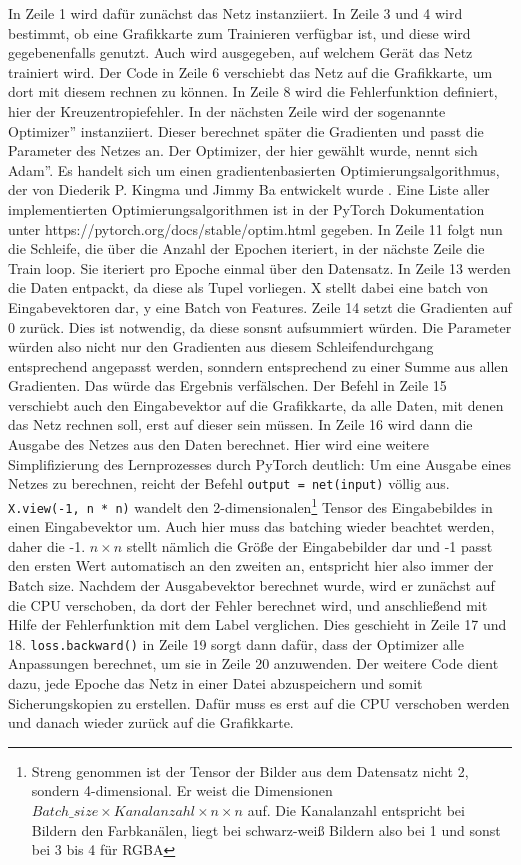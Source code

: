 \documentclass[11pt]{article}
\begin{document}
In Zeile 1 wird dafür zunächst das Netz instanziiert. In Zeile 3 und 4 wird bestimmt, ob eine Grafikkarte zum Trainieren verfügbar ist, und diese wird gegebenenfalls genutzt. Auch wird ausgegeben, auf welchem Gerät das Netz trainiert wird. Der Code in Zeile 6 verschiebt das Netz auf die Grafikkarte, um dort mit diesem rechnen zu können. In Zeile 8 wird die Fehlerfunktion definiert, hier der Kreuzentropiefehler. In der nächsten Zeile wird der sogenannte \glqq Optimizer'' instanziiert. Dieser berechnet später die Gradienten und passt die Parameter des Netzes an. Der Optimizer, der hier gewählt wurde, nennt sich \glqq Adam''. Es handelt sich um einen gradientenbasierten Optimierungsalgorithmus, der von Diederik P. Kingma und Jimmy Ba entwickelt wurde \cite{7}. Eine Liste aller implementierten Optimierungsalgorithmen ist in der PyTorch Dokumentation unter https://pytorch.org/docs/stable/optim.html gegeben. In Zeile 11 folgt nun die Schleife, die über die Anzahl der Epochen iteriert, in der nächste Zeile die Train loop. Sie iteriert pro Epoche einmal über den Datensatz. In Zeile 13 werden die Daten entpackt, da diese als Tupel vorliegen. X stellt dabei eine batch von Eingabevektoren dar, y eine Batch von Features. Zeile 14 setzt die Gradienten auf 0 zurück. Dies ist notwendig, da diese sonsnt aufsummiert würden. Die Parameter würden also nicht nur den Gradienten aus diesem Schleifendurchgang entsprechend angepasst werden, sonndern entsprechend zu einer Summe aus allen Gradienten. Das würde das Ergebnis verfälschen. Der Befehl in Zeile 15 verschiebt auch den Eingabevektor auf die Grafikkarte, da alle Daten, mit denen das Netz rechnen soll, erst auf dieser sein müssen. In Zeile 16 wird dann die Ausgabe des Netzes aus den Daten berechnet. Hier wird eine weitere Simplifizierung des Lernprozesses durch PyTorch deutlich: Um eine Ausgabe eines Netzes zu berechnen, reicht der Befehl \texttt{output = net(input)} völlig aus. \texttt{X.view(-1, n * n)} wandelt den 2-dimensionalen\footnote{Streng genommen ist der Tensor der Bilder aus dem Datensatz nicht 2, sondern 4-dimensional. Er weist die Dimensionen $Batch\_size\times Kanalanzahl\times n \times n$ auf. Die Kanalanzahl entspricht bei Bildern den Farbkanälen, liegt bei schwarz-weiß Bildern also bei 1 und sonst bei 3 bis 4 für RGBA} Tensor des Eingabebildes in einen Eingabevektor um. Auch hier muss das batching wieder beachtet werden, daher die -1. $n\times n$ stellt nämlich die Größe der Eingabebilder dar und -1 passt den ersten Wert automatisch an den zweiten an, entspricht hier also immer der Batch size. Nachdem der Ausgabevektor berechnet wurde, wird er zunächst auf die CPU verschoben, da dort der Fehler berechnet wird, und anschließend mit Hilfe der Fehlerfunktion mit dem Label verglichen. Dies geschieht in Zeile 17 und 18. \texttt{loss.backward()} in Zeile 19 sorgt dann dafür, dass der Optimizer alle Anpassungen berechnet, um sie in Zeile 20 anzuwenden. Der weitere Code dient dazu, jede Epoche das Netz in einer Datei abzuspeichern und somit Sicherungskopien zu erstellen. Dafür muss es erst auf die CPU verschoben werden und danach wieder zurück auf die Grafikkarte.
\end{document}

